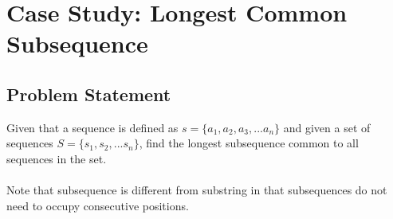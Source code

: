 \section{Case Study: Longest Common Subsequence}

\subsection*{Problem Statement}
Given that a sequence is defined as $s = \{ a_1, a_2, a_3, ... a_n \}$ and given a set of sequences $S = \{ s_1, s_2, ... s_n \}$, find the longest subsequence common to all sequences in the set.\\\\
Note that subsequence is different from substring in that subsequences do not need to occupy consecutive positions.

